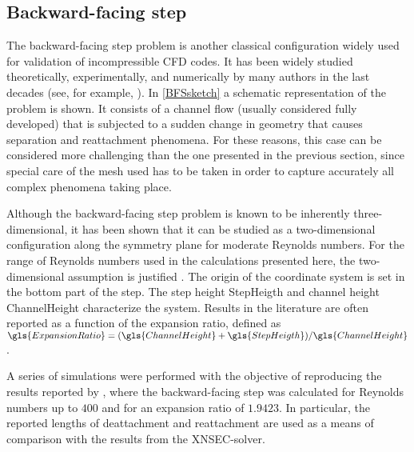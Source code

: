
\subsection{Backward-facing step}\label{ssec:BackwardFacingStep}
The backward-facing step problem is another classical configuration widely used for validation of incompressible CFD codes. It has been widely studied theoretically, experimentally, and numerically by many authors in the last decades (see, for example, \textcite{armalyExperimentalTheoreticalInvestigation1983,barkleyThreedimensionalInstabilityFlow2000,biswasBackwardFacingStepFlows2004} ).  In \cref{BFSsketch} a schematic representation of the problem is shown. It consists of a channel flow (usually considered fully developed) that is subjected to a sudden change in geometry that causes separation and reattachment phenomena. For these reasons, this case can be considered more challenging than the one presented in the previous section, since special care of the mesh used has to be taken in order to capture accurately all complex phenomena taking place.

Although the backward-facing step problem is known to be inherently three-dimensional, it has been shown that it can be studied as a two-dimensional configuration along the symmetry plane for moderate Reynolds numbers. For the range of Reynolds numbers used in the calculations presented here, the two-dimensional assumption is justified \parencite{barkleyThreedimensionalInstabilityFlow2000, biswasBackwardFacingStepFlows2004}.  The origin of the coordinate system is set in the bottom part of the step. The step height \gls{StepHeigth} and channel height \gls{ChannelHeight} characterize the system. Results in the literature are often reported as a function of the expansion ratio, defined as $\gls{ExpansionRatio} = (\gls{ChannelHeight}+\gls{StepHeigth})/\gls{ChannelHeight}$.

A series of simulations were performed with the objective of reproducing the results reported by \textcite{biswasBackwardFacingStepFlows2004}, where the backward-facing step was calculated for Reynolds numbers up to $400$ and for an expansion ratio of $1.9423$. In particular, the reported lengths of deattachment and reattachment are used as a means of comparison with the results from the XNSEC-solver.

